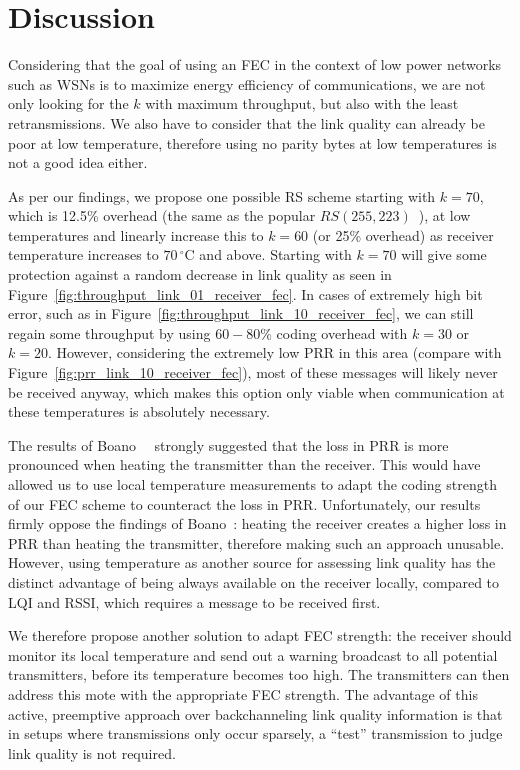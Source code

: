 \section{Discussion}

Considering that the goal of using an \ac{FEC} in the context of low power networks such as \ac{WSN}s is to maximize energy efficiency of communications, we are not only looking for the $k$ with maximum throughput, but also with the least retransmissions.
We also have to consider that the link quality can already be poor at low temperature, therefore using no parity bytes at low temperatures is not a good idea either.

As per our findings, we propose one possible \ac{RS} scheme starting with $k=70$, which is 12.5\% overhead (the same as the popular $RS(255,223)$~\cite{Ma2009}), at low temperatures and linearly increase this to $k=60$ (or 25\% overhead) as receiver temperature increases to $70\,^{\circ}\mathrm{C}$ and above.
Starting with $k=70$ will give some protection against a random decrease in link quality as seen in Figure~\ref{fig:throughput_link_01_receiver_fec}.
In cases of extremely high bit error, such as in Figure~\ref{fig:throughput_link_10_receiver_fec}, we can still regain some throughput by using $60-80\%$ coding overhead with $k=30$ or $k=20$.
However, considering the extremely low \ac{PRR} in this area (compare with Figure~\ref{fig:prr_link_10_receiver_fec}), most of these messages will likely never be received anyway, which makes this option only viable when communication at these temperatures is absolutely necessary.

The results of Boano~\etal~\cite{Boano2013} strongly suggested that the loss in \ac{PRR} is more pronounced when heating the transmitter than the receiver.
This would have allowed us to use local temperature measurements to adapt the coding strength of our \ac{FEC} scheme to counteract the loss in \ac{PRR}.
Unfortunately, our results firmly oppose the findings of Boano~\etal{}: heating the receiver creates a higher loss in \ac{PRR} than heating the transmitter, therefore making such an approach unusable.
However, using temperature as another source for assessing link quality has the distinct advantage of being always available on the receiver locally, compared to \ac{LQI} and \ac{RSSI}, which requires a message to be received first.

We therefore propose another solution to adapt \ac{FEC} strength:
the receiver should monitor its local temperature and send out a warning broadcast to all potential transmitters, before its temperature becomes too high.
The transmitters can then address this mote with the appropriate \ac{FEC} strength.
The advantage of this active, preemptive approach over backchanneling link quality information is that in setups where transmissions only occur sparsely, a ``test'' transmission to judge link quality is not required.

